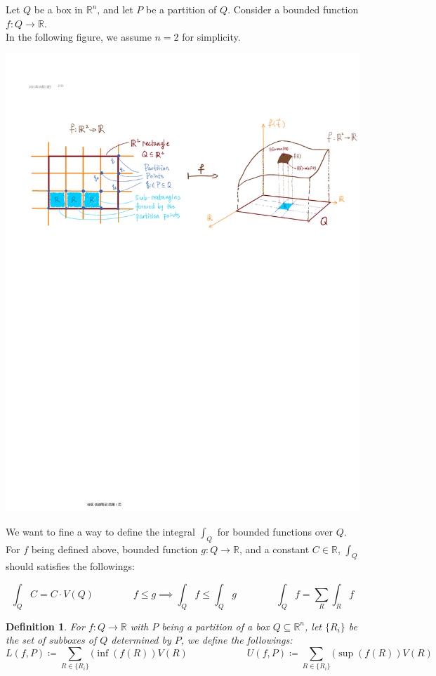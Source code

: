 \documentclass[11pt,oneside]{book}
\theoremstyle{break}
\theoremstyle{break}
\newtheorem{defn}{Definition}[corL]
\newcommand{\R}{\mathbb{R}}
\begin{document}
Let $Q$ be a box in $\R^n$, and let $P$ be a partition of $Q$. Consider a bounded function $f:Q \to \R$.\\ In the following figure, we assume $n=2$ for simplicity. 
\begin{center}
\includegraphics[scale=0.73]{integration.pdf}
\end{center}
We want to fine a way to define the integral $\int_Q$ for bounded functions over $Q$. For $f$ being defined above, bounded function $g:Q \to \R$, and a constant $C \in \R$, $\int_Q$ should satisfies the followings: 

$$\int_Q C = C \cdot V(Q) \qquad\qquad f\leq g \implies \int_Q f \leq \int_Q g \qquad\qquad \int_Q f = \sum_R \int_R f$$

\begin{defn}
For $f:Q \to \R$ with $P$ being a partition of a box $Q\subseteq \R^n$, let $\{R_i\}$ be the set of subboxes of $Q$ determined by $P$, we define the followings:
$$L(f,P) \coloneqq \sum_{R\in \{R_i\}} (\inf(f(R))V(R) \qquad\qquad\qquad	U(f,P) \coloneqq \sum_{R\in \{R_i\}} (\sup(f(R))V(R)$$
\end{defn}
\end{document}
